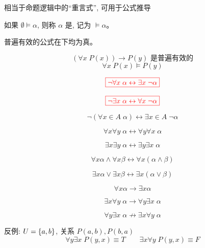 \begin{frame}{}
  \begin{center}
    相当于命题逻辑中的``重言式'', 可用于公式推导
  \end{center}

  \begin{definition}
    如果 $\emptyset \models \alpha$, 则称 $\alpha$ 是,
    记为 $\models \alpha$。
  \end{definition}

  \pause
  \vspace{0.60cm}
  \begin{center}
    普遍有效的公式在下均为真。

    \[
      (\forall x\; P(x)) \to P(y) \text{ 是普遍有效的}
    \]
    \[
      \forall x\; P(x) \models P(y)
    \]
  \end{center}
\end{frame}

\begin{frame}{}
  \[
    \textcolor{red}{\boxed{\lnot \forall x\; \alpha \leftrightarrow \exists x\; \lnot \alpha}}
  \]

  \[
    \textcolor{red}{\boxed{\lnot \exists x\; \alpha \leftrightarrow \forall x\; \lnot \alpha}}
  \]

  \pause
  \[
    \lnot (\forall x \in A\; \alpha) \leftrightarrow \exists x \in A\; \lnot \alpha
  \]
\end{frame}

\begin{frame}{}
  \[
    \forall x \forall y\; \alpha \leftrightarrow \forall y \forall x\; \alpha
  \]

  \[
    \exists x \exists y\; \alpha \leftrightarrow \exists y \exists x\; \alpha
  \]
\end{frame}

\begin{frame}{}
  \[
    \forall x \alpha \land \forall x \beta
      \leftrightarrow \forall x (\alpha \land \beta)
  \]

  \[
    \exists x \alpha \lor \exists x \beta
      \leftrightarrow \exists x (\alpha \lor \beta)
  \]
\end{frame}

\begin{frame}{}
  \[
    \forall x \alpha \to \exists x \alpha
  \]

  \[
    \exists x \forall y\; \alpha \to \forall y \exists x\; \alpha
  \]

  \[
    \forall y \exists x\; \alpha \not\to \exists x \forall y\; \alpha
  \]

  \pause
  \vspace{0.30cm}
  \begin{center}
    反例: $U = \{a, b\}$, \qquad 关系 $P(a, b), P(b, a)$
    \[
      \forall y \exists x\; P(y, x) \equiv T \qquad \exists x \forall y\; P(y, x) \equiv F
    \]
  \end{center}
\end{frame}


